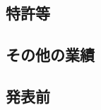 \documentclass[11pt,a4paper,twoside]{jarticle}
\newcommand{\研究課題名}{Symmetry breaking operators}
\newcommand{\研究機関名}{東京大学}
\newcommand{\申請者氏名}{レオンチエフ\,オレクシィ}
\newcommand{\研究代表者氏名}{\申請者氏名}
\newcommand{\研究期間の最終元号年度}{31}	%
\begin{document}
\subsection{特許等}
\newcommand{\特許等}{%

	なし
}

\subsection{その他の業績}
\newcommand{\その他の業績}{%
		\begin{enumerate}
			\item Monbukagakusho Scholarship recipient April 2014--March 2016.
			\item The University of Tokyo Graduate School of Mathematical Sciences Director's Prize of the academic year 2015.
		\end{enumerate}
}

\subsection{発表前}
\newcommand{\発表前の業績}{%
}
\end{document}
